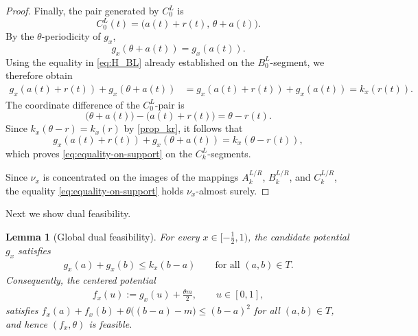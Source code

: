 \documentclass{article}
\newtheorem{lemma}[theorem]{Lemma}
\begin{document}
\begin{proof}
Finally, the pair generated by \(C_0^L\) is
\[
    C_0^L(t)
    =
    \bigl(a(t)+r(t),\,\theta+a(t)\bigr).
\]
By the \(\theta\)-periodicity of \(g_x\),
\[
    g_x(\theta+a(t))=g_x(a(t)).
\]
Using the equality in \eqref{eq:H_BL} already established on the \(B_0^L\)-segment, we therefore obtain
\begin{align*}
    g_x(a(t)+r(t))+g_x(\theta+a(t))
    &=
    g_x(a(t)+r(t))+g_x(a(t))
    =
    k_x(r(t)).
\end{align*}
The coordinate difference of the \(C_0^L\)-pair is
\[
    \bigl(\theta+a(t)\bigr)
    -
    \bigl(a(t)+r(t)\bigr)
    =
    \theta-r(t).
\]
Since \(k_x(\theta-r)=k_x(r)\) by \eqref{prop_kr}, it follows that
\[
    g_x(a(t)+r(t))+g_x(\theta+a(t))
    =
    k_x(\theta-r(t)),
\]
which proves \eqref{eq:equality-on-support} on the \(C_k^L\)-segments.

Since \(\nu_x\) is concentrated on the images of the mappings \(A_k^{L/R}\), \(B_k^{L/R}\), and \(C_k^{L/R}\), the equality \eqref{eq:equality-on-support} holds \(\nu_x\)-almost surely.
\end{proof}


Next we show dual feasibility.
\begin{lemma}[Global dual feasibility]
\label{lem:global-dual-feasibility}
For every \(x\in[-\frac12,1)\), the candidate potential \(g_x\) satisfies
\begin{align}\label{eq:global-dual-feasibility}
    g_x(a)+g_x(b)
    \leq
    k_x(b-a)
    \qquad
    \text{for all }(a,b)\in T.
\end{align}
Consequently, the centered potential
\begin{align}\label{def_fxvgx}
    f_x(u):=g_x(u)+\frac{\theta m}{2},
    \qquad u\in[0,1],
\end{align}
satisfies \(f_x(a)+f_x(b) +\theta\bigl((b-a)-m\bigr) \leq (b-a)^2 \) for all \((a,b)\in T\), and hence \((f_x,\theta)\) is feasible.
\end{lemma}
\end{document}
